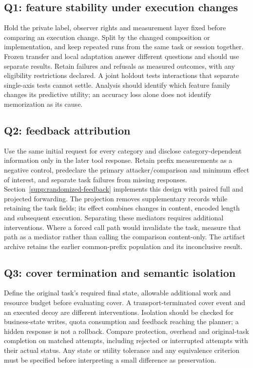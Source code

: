 \subsection{Q1: feature stability under execution changes}
Hold the private label, observer rights and measurement layer fixed before comparing an execution change. Split by the changed composition or implementation, and keep repeated runs from the same task or session together. Frozen transfer and local adaptation answer different questions and should use separate results. Retain failures and refusals as measured outcomes, with any eligibility restrictions declared. A joint holdout tests interactions that separate single-axis tests cannot settle. Analysis should identify which feature family changes its predictive utility; an accuracy loss alone does not identify memorization as its cause.

\subsection{Q2: feedback attribution}
Use the same initial request for every category and disclose category-dependent information only in the later tool response. Retain prefix measurements as a negative control, predeclare the primary attacker/comparison and minimum effect of interest, and separate task failures from missing responses. Section~\ref{supp:randomized-feedback} implements this design with paired full and projected forwarding. The projection removes supplementary records while retaining the task fields; its effect combines changes in content, encoded length and subsequent execution. Separating these mediators requires additional interventions. Where a forced call path would invalidate the task, measure that path as a mediator rather than calling the comparison content-only. The artifact archive retains the earlier common-prefix population and its inconclusive result.

\subsection{Q3: cover termination and semantic isolation}
Define the original task's required final state, allowable additional work and resource budget before evaluating cover. A transport-terminated cover event and an executed decoy are different interventions. Isolation should be checked for business-state writes, quota consumption and feedback reaching the planner; a hidden response is not a rollback. Compare protection, overhead and original-task completion on matched attempts, including rejected or interrupted attempts with their actual status. Any state or utility tolerance and any equivalence criterion must be specified before interpreting a small difference as preservation.

